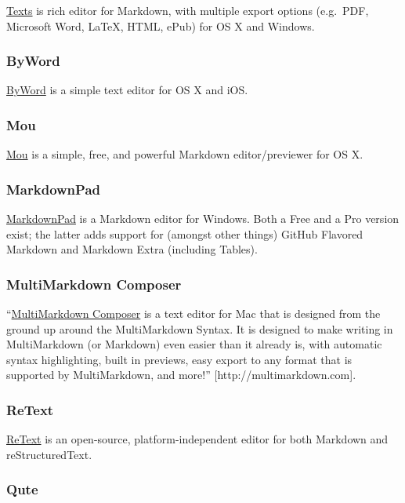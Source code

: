 \documentclass[	DIV=calc,%
							paper=a4,%
							fontsize=10pt]{scrartcl}	 					%
\begin{document}
\href{http://www.texts.io}{Texts} is rich editor for Markdown, with
multiple export options (e.g.~PDF, Microsoft Word, LaTeX, HTML, ePub)
for OS X and Windows.

\subsubsection{ByWord}\label{byword}

\href{http://www.bywordapp.com}{ByWord} is a simple text editor for OS X
and iOS.

\subsubsection{Mou}\label{mou}

\href{http://mouapp.com}{Mou} is a simple, free, and powerful Markdown
editor/previewer for OS X.

\subsubsection{MarkdownPad}\label{markdownpad}

\href{http://markdownpad.com/}{MarkdownPad} is a Markdown editor for
Windows. Both a Free and a Pro version exist; the latter adds support
for (amongst other things) GitHub Flavored Markdown and Markdown Extra
(including Tables).

\subsubsection{MultiMarkdown Composer}\label{multimarkdown-composer}

``\href{http://multimarkdown.com}{MultiMarkdown Composer} is a text
editor for Mac that is designed from the ground up around the
MultiMarkdown Syntax. It is designed to make writing in MultiMarkdown
(or Markdown) even easier than it already is, with automatic syntax
highlighting, built in previews, easy export to any format that is
supported by MultiMarkdown, and more!'' {[}http://multimarkdown.com{]}.

\subsubsection{ReText}\label{retext}

\href{http://sourceforge.net/p/retext/home/ReText/}{ReText} is an
open-source, platform-independent editor for both Markdown and
reStructuredText.

\subsubsection{Qute}\label{qute}
\end{document}
